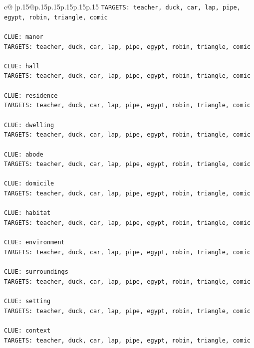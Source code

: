 \documentclass{article}
\begin{document}
{\begin{supertabular}{c@{$\;$}|p{.15\linewidth}@{}p{.15\linewidth}p{.15\linewidth}p{.15\linewidth}p{.15\linewidth}p{.15\linewidth}}
{{{\texttt{TARGETS: teacher, duck, car, lap, pipe, egypt, robin, triangle, comic} \\
\\ 
\texttt{CLUE: manor} \\
\texttt{TARGETS: teacher, duck, car, lap, pipe, egypt, robin, triangle, comic} \\
\\ 
\texttt{CLUE: hall} \\
\texttt{TARGETS: teacher, duck, car, lap, pipe, egypt, robin, triangle, comic} \\
\\ 
\texttt{CLUE: residence} \\
\texttt{TARGETS: teacher, duck, car, lap, pipe, egypt, robin, triangle, comic} \\
\\ 
\texttt{CLUE: dwelling} \\
\texttt{TARGETS: teacher, duck, car, lap, pipe, egypt, robin, triangle, comic} \\
\\ 
\texttt{CLUE: abode} \\
\texttt{TARGETS: teacher, duck, car, lap, pipe, egypt, robin, triangle, comic} \\
\\ 
\texttt{CLUE: domicile} \\
\texttt{TARGETS: teacher, duck, car, lap, pipe, egypt, robin, triangle, comic} \\
\\ 
\texttt{CLUE: habitat} \\
\texttt{TARGETS: teacher, duck, car, lap, pipe, egypt, robin, triangle, comic} \\
\\ 
\texttt{CLUE: environment} \\
\texttt{TARGETS: teacher, duck, car, lap, pipe, egypt, robin, triangle, comic} \\
\\ 
\texttt{CLUE: surroundings} \\
\texttt{TARGETS: teacher, duck, car, lap, pipe, egypt, robin, triangle, comic} \\
\\ 
\texttt{CLUE: setting} \\
\texttt{TARGETS: teacher, duck, car, lap, pipe, egypt, robin, triangle, comic} \\
\\ 
\texttt{CLUE: context} \\
\texttt{TARGETS: teacher, duck, car, lap, pipe, egypt, robin, triangle, comic} \\
}}}
\end{supertabular}}
\end{document}
